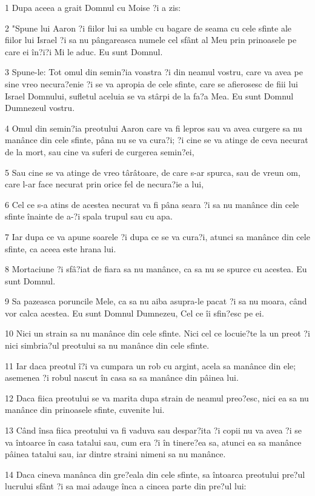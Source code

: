 \par 1 Dupa aceea a grait Domnul cu Moise ?i a zis:
\par 2 "Spune lui Aaron ?i fiilor lui sa umble cu bagare de seama cu cele sfinte ale fiilor lui Israel ?i sa nu pângareasca numele cel sfânt al Meu prin prinoasele pe care ei în?i?i Mi le aduc. Eu sunt Domnul.
\par 3 Spune-le: Tot omul din semin?ia voastra ?i din neamul vostru, care va avea pe sine vreo necura?enie ?i se va apropia de cele sfinte, care se afierosesc de fiii lui Israel Domnului, sufletul aceluia se va stârpi de la fa?a Mea. Eu sunt Domnul Dumnezeul vostru.
\par 4 Omul din semin?ia preotului Aaron care va fi lepros sau va avea curgere sa nu manânce din cele sfinte, pâna nu se va cura?i; ?i cine se va atinge de ceva necurat de la mort, sau cine va suferi de curgerea semin?ei,
\par 5 Sau cine se va atinge de vreo târâtoare, de care s-ar spurca, sau de vreun om, care l-ar face necurat prin orice fel de necura?ie a lui,
\par 6 Cel ce s-a atins de acestea necurat va fi pâna seara ?i sa nu manânce din cele sfinte înainte de a-?i spala trupul sau cu apa.
\par 7 Iar dupa ce va apune soarele ?i dupa ce se va cura?i, atunci sa manânce din cele sfinte, ca aceea este hrana lui.
\par 8 Mortaciune ?i sfâ?iat de fiara sa nu manânce, ca sa nu se spurce cu acestea. Eu sunt Domnul.
\par 9 Sa pazeasca poruncile Mele, ca sa nu aiba asupra-le pacat ?i sa nu moara, când vor calca acestea. Eu sunt Domnul Dumnezeu, Cel ce îi sfin?esc pe ei.
\par 10 Nici un strain sa nu manânce din cele sfinte. Nici cel ce locuie?te la un preot ?i nici simbria?ul preotului sa nu manânce din cele sfinte.
\par 11 Iar daca preotul î?i va cumpara un rob cu argint, acela sa manânce din ele; asemenea ?i robul nascut în casa sa sa manânce din pâinea lui.
\par 12 Daca fiica preotului se va marita dupa strain de neamul preo?esc, nici ea sa nu manânce din prinoasele sfinte, cuvenite lui.
\par 13 Când însa fiica preotului va fi vaduva sau despar?ita ?i copii nu va avea ?i se va întoarce în casa tatalui sau, cum era ?i în tinere?ea sa, atunci ea sa manânce pâinea tatalui sau, iar dintre straini nimeni sa nu manânce.
\par 14 Daca cineva manânca din gre?eala din cele sfinte, sa întoarca preotului pre?ul lucrului sfânt ?i sa mai adauge înca a cincea parte din pre?ul lui:
